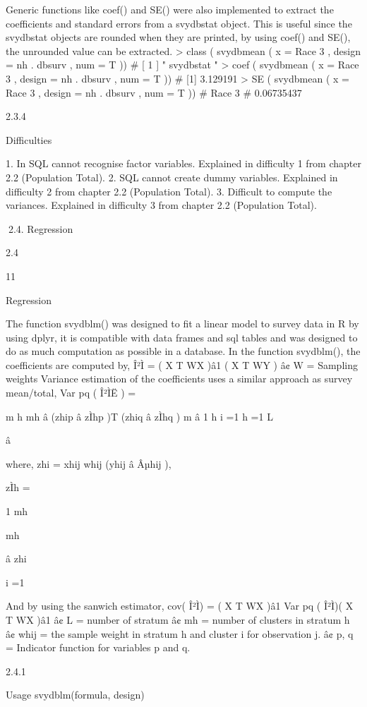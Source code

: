 Generic functions like coef() and SE() were also implemented to extract the
coefficients and standard errors from a svydbstat object. This is useful since the
svydbstat objects are rounded when they are printed, by using coef() and SE(), the
unrounded value can be extracted.
> class ( svydbmean ( x = Race 3 , design = nh . dbsurv , num = T ))
# [ 1 ] " svydbstat "
> coef ( svydbmean ( x = Race 3 , design = nh . dbsurv , num = T ))
# [1] 3.129191
> SE ( svydbmean ( x = Race 3 , design = nh . dbsurv , num = T ))
#
Race 3
# 0.06735437

2.3.4

Difficulties

1. In SQL cannot recognise factor variables. Explained in difficulty 1 from chapter
2.2 (Population Total).
2. SQL cannot create dummy variables. Explained in difficulty 2 from chapter 2.2
(Population Total).
3. Difficult to compute the variances. Explained in difficulty 3 from chapter 2.2
(Population Total).

2.4. Regression

2.4

11

Regression

The function svydblm() was designed to fit a linear model to survey data in R by
using dplyr, it is compatible with data frames and sql tables and was designed to do
as much computation as possible in a database.
In the function svydblm(), the coefficients are computed by,
Î²Ì = ( X T WX )â1 ( X T WY )
â¢ W = Sampling weights
Variance estimation of the coefficients uses a similar approach as survey mean/total,
Var pq ( Î²ÌË ) =

m h mh
â (zhip â zÌhp )T (zhiq â zÌhq )
m
â
1
h
i =1
h =1
L

â

where,
zhi = xhij whij (yhij â Âµhij ),

zÌh =

1
mh

mh

â zhi

i =1

And by using the sanwich estimator,
cov( Î²Ì) = ( X T WX )â1 Var pq ( Î²Ì)( X T WX )â1
â¢ L = number of stratum
â¢ mh = number of clusters in stratum h
â¢ whij = the sample weight in stratum h and cluster i for observation j.
â¢ p, q = Indicator function for variables p and q.

2.4.1

Usage
svydblm(formula, design)

